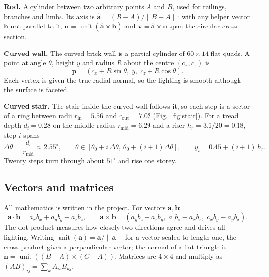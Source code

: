 \documentclass[11pt,a4paper]{article}
\newcommand{\vect}[1]{\mathbf{#1}}
\newcommand{\unit}[1]{\operatorname{unit}\!\left(#1\right)}
\begin{document}
\textbf{Rod.} A cylinder between two arbitrary points $A$ and $B$, used for
railings, branches and limbs. Its axis is $\hat{\vect a}=(B-A)/\lVert B-A\rVert$;
with any helper vector $\vect h$ not parallel to it,
$\vect u=\unit{\hat{\vect a}\times\vect h}$ and $\vect v=\hat{\vect a}\times\vect u$
span the circular cross-section.

\textbf{Curved wall.} The curved brick wall is a partial cylinder of
$60\times14$ flat quads. A point at angle $\theta$, height $y$ and radius $R$
about the centre $(c_x,c_z)$ is
\begin{equation}
\vect p=(c_x+R\sin\theta,\; y,\; c_z+R\cos\theta).
\end{equation}
Each vertex is given the true radial normal, so the lighting is smooth
although the surface is faceted.

\textbf{Curved stair.} The stair inside the curved wall follows it, so each
step is a sector of a ring between radii $r_{\mathrm{in}}=5.56$ and
$r_{\mathrm{out}}=7.02$ (Fig.~\ref{fig:stair}). For a tread depth $d_t=0.28$
on the middle radius $r_{\mathrm{mid}}=6.29$ and a riser $h_r=3.6/20=0.18$,
step $i$ spans
\begin{equation}
\Delta\theta=\frac{d_t}{r_{\mathrm{mid}}}\approx2.55^\circ,\qquad
\theta\in[\theta_0+i\,\Delta\theta,\;\theta_0+(i+1)\Delta\theta],\qquad
y_i=0.45+(i+1)\,h_r .
\end{equation}
Twenty steps turn through about $51^\circ$ and rise one storey.

\subsection{Vectors and matrices}
All mathematics is written in the project. For vectors $\vect a,\vect b$:
\begin{equation}
\vect a\cdot\vect b=a_xb_x+a_yb_y+a_zb_z,\qquad
\vect a\times\vect b=(a_yb_z-a_zb_y,\;a_zb_x-a_xb_z,\;a_xb_y-a_yb_x).
\end{equation}
The dot product measures how closely two directions agree and drives all
lighting. Writing $\unit{\vect a}=\vect a/\lVert\vect a\rVert$ for a vector scaled to length one, the cross product gives a perpendicular vector; the normal of a
flat triangle is $\vect n=\unit{(B-A)\times(C-A)}$. Matrices are $4\times4$
and multiply as $(AB)_{ij}=\sum_{k}A_{ik}B_{kj}$.
\end{document}
